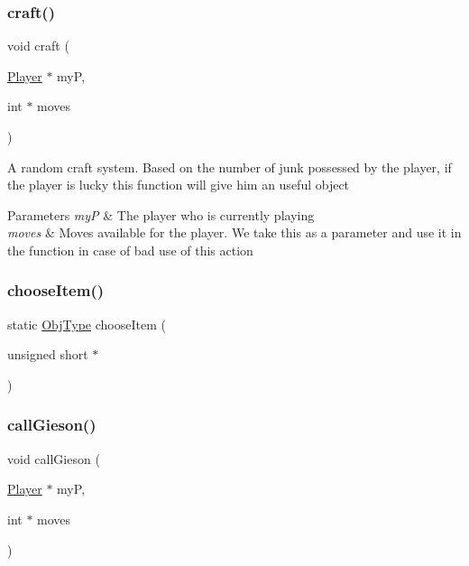 \subsubsection{\texorpdfstring{craft()}{craft()}}
{\footnotesize\ttfamily void craft (\begin{DoxyParamCaption}\item[{\hyperlink{group__game_gac6f795d0d2e88ee469ddc704329e7cc3}{Player} $\ast$}]{myP,  }\item[{int $\ast$}]{moves }\end{DoxyParamCaption})\hspace{0.3cm}{\ttfamily [static]}}

A random craft system. Based on the number of junk possessed by the player, if the player is lucky this function will give him an useful object 
\begin{DoxyParams}{Parameters}
{\em myP} & The player who is currently playing \\
\hline
{\em moves} & Moves available for the player. We take this as a parameter and use it in the function in case of bad use of this action \\
\hline
\end{DoxyParams}
\mbox{\label{group__game_gae64c2690b081867e40de1714f9fa669d}} 
\subsubsection{\texorpdfstring{choose\+Item()}{chooseItem()}}
{\footnotesize\ttfamily static \hyperlink{gamelib_8h_a21ada50c882656c2a4723dde25f56d4a}{Obj\+Type} choose\+Item (\begin{DoxyParamCaption}\item[{unsigned short $\ast$}]{ }\end{DoxyParamCaption})\hspace{0.3cm}{\ttfamily [static]}}

\mbox{\label{group__game_gab3355c8ac255799fc0a453b3177afdf6}} 
\subsubsection{\texorpdfstring{call\+Gieson()}{callGieson()}}
{\footnotesize\ttfamily void call\+Gieson (\begin{DoxyParamCaption}\item[{\hyperlink{group__game_gac6f795d0d2e88ee469ddc704329e7cc3}{Player} $\ast$}]{myP,  }\item[{int $\ast$}]{moves }\end{DoxyParamCaption})\hspace{0.3cm}{\ttfamily [static]}}

